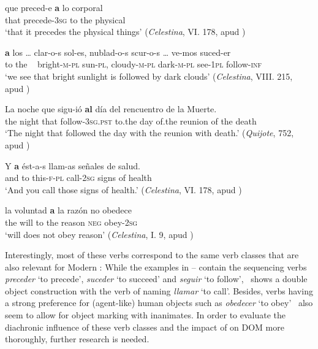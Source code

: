 \documentclass[output=paper]{LSP/langsci}
\begin{document}
\begin{exe}
\ex \label{08-ga-ex:21} %
\ea \label{08-ga-ex:21a} 
\gll que preced-e \textbf{a} lo corporal\\
 that precede-3\textsc{sg} to the physical\\
\glt ‘that it precedes the physical things’ (\textit{Celestina}, VI. 178, apud \citealt[451]{Laca2006Objeto})

\ex \label{08-ga-ex:21b}
\gll \textbf{a} los {\ob}…{\cb} clar-o-s sol-es, nublad-o-s scur-o-s {\ob}…{\cb} ve-mos suced-er\\
 to the ~ bright-\textsc{m-pl} sun-\textsc{pl}, cloudy-\textsc{m-pl} dark-\textsc{m-pl} {} see-\textsc{1pl} follow-\textsc{inf}\\
\glt ‘we see that bright sunlight is followed by dark clouds’ (\textit{Celestina}, VIII. 215, apud \citealt[451]{Laca2006Objeto})

\ex \label{08-ga-ex:21c}
\gll La noche que sigu-ió \textbf{al} día del rencuentro de la Muerte.\\
 the night that follow-\textsc{3sg.pst} to.the day of.the reunion of the death\\
\glt ‘The night that followed the day with the reunion with death.’ (\textit{Quijote}, 752, apud \citealt[451]{Laca2006Objeto})

\ex \label{08-ga-ex:21d}
\gll Y \textbf{a} ést-a-s llam-as señales de salud.\\
 and to this-\textsc{f}-\textsc{pl} call-\textsc{2sg} signs of health\\
 \glt ‘And you call those signs of health.’ (\textit{Celestina}, VI. 178, apud \citealt[451]{Laca2006Objeto})

\ex \label{08-ga-ex:21e}
\gll la voluntad \textbf{a} la razón no obedece\\
 the will to the reason \textsc{neg} obey-\textsc{2sg}\\
\glt ‘will does not obey reason’ (\textit{Celestina}, I. 9, apud \citealt[452]{Laca2006Objeto})
\z
\end{exe}

Interestingly, most of these verbs correspond to the same verb classes that are also relevant for Modern : While the examples in -- contain the sequencing verbs \textit{preceder} ‘to precede’, \textit{suceder} ‘to succeed’ and \textit{seguir} ‘to follow’,~ shows a double object construction with the verb of naming \textit{llamar} ‘to call’. Besides, verbs having a strong preference for (agent-like) human objects such as \textit{obedecer} ‘to obey’~ also seem to allow for object marking with inanimates. In order to evaluate the diachronic influence of these verb classes and the impact of  on DOM more thoroughly, further research is needed. 
\end{document}
